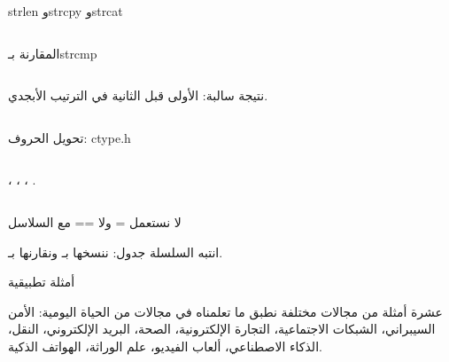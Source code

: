 \documentclass[aspectratio=169, 11pt, t, xcolor={table}]{beamer}
\begin{document}
\begin{frame}[t]{\textenglish{strlen} و\textenglish{strcpy} و\textenglish{strcat}}
    \begin{columns}[T]
    \end{columns}
\end{frame}

\begin{frame}[t]{المقارنة بـ\textenglish{strcmp}}
    \begin{columns}[T]
        {\small نتيجة سالبة: الأولى قبل الثانية في الترتيب الأبجدي.\par}
        \vspace{0.3cm}
    \end{columns}
\end{frame}

\begin{frame}[t]{تحويل الحروف: \textenglish{ctype.h}}
    \begin{columns}[T]
        {\small {}، ، ، .\par}
        \vspace{0.3cm}
    \end{columns}
\end{frame}

\begin{frame}{لا نستعمل = ولا == مع السلاسل}
    \begin{center}
    \begin{minipage}{0.7\textwidth}
    \end{minipage}
    \end{center}
    \begin{obox}{\faExclamationTriangle\quad انتبه}
        السلسلة جدول: ننسخها بـ ونقارنها بـ.
    \end{obox}
\end{frame}

\begin{frame}{أمثلة تطبيقية}
    \begin{tbox}{\faLaptopCode\quad عشرة أمثلة من مجالات مختلفة}
        نطبق ما تعلمناه في مجالات من الحياة اليومية:
        الأمن السيبراني، الشبكات الاجتماعية، التجارة الإلكترونية، الصحة، البريد الإلكتروني، النقل، الذكاء الاصطناعي، ألعاب الفيديو، علم الوراثة، الهواتف الذكية.
    \end{tbox}
\end{frame}
\end{document}
